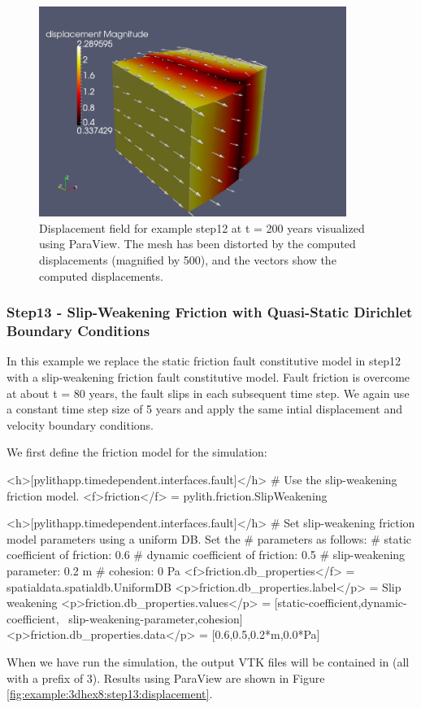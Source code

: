 \begin{figure}
  \includegraphics[width=10cm]{examples/figs/3dhex8_step12-displ-t200}
  \caption{Displacement field for example step12 at t = 200 years visualized
    using ParaView. The mesh has been distorted by the computed displacements
    (magnified by 500), and the vectors show the computed displacements.}
  \label{fig:example:3dhex8:step12:displacement}
\end{figure}


\subsubsection{Step13 - Slip-Weakening Friction with Quasi-Static Dirichlet Boundary Conditions}

In this example we replace the static friction fault constitutive
model in step12 with a slip-weakening friction fault constitutive
model. Fault friction is overcome at about t = 80 years, the fault
slips in each subsequent time step. We again use a constant time step
size of 5 years and apply the same intial displacement and velocity
boundary conditions.

We first define the friction model for the simulation:
\begin{cfg}
<h>[pylithapp.timedependent.interfaces.fault]</h>
# Use the slip-weakening friction model.
<f>friction</f> = pylith.friction.SlipWeakening

<h>[pylithapp.timedependent.interfaces.fault]</h>
# Set slip-weakening friction model parameters using a uniform DB. Set the
# parameters as follows:
# static coefficient of friction: 0.6
# dynamic coefficient of friction: 0.5
# slip-weakening parameter: 0.2 m
# cohesion: 0 Pa
<f>friction.db_properties</f> = spatialdata.spatialdb.UniformDB
<p>friction.db_properties.label</p> = Slip weakening
<p>friction.db_properties.values</p> = [static-coefficient,dynamic-coefficient, \
   slip-weakening-parameter,cohesion]
<p>friction.db_properties.data</p> = [0.6,0.5,0.2{*}m,0.0{*}Pa]
\end{cfg}
When we have run the simulation, the output VTK files will be contained
in \filename{examples/3d/hex8/output} (all with a prefix of 3).
Results using ParaView are shown in Figure \vref{fig:example:3dhex8:step13:displacement}.


